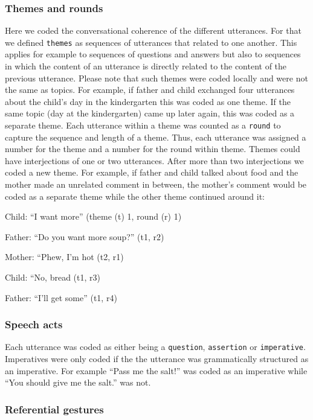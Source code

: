 \documentclass[
  man,floatsintext]{apa6}
\begin{document}
\hypertarget{themes-and-rounds}{%
\subsubsection{Themes and rounds}\label{themes-and-rounds}}

Here we coded the conversational coherence of the different utterances. For that we defined \texttt{themes} as sequences of utterances that related to one another. This applies for example to sequences of questions and answers but also to sequences in which the content of an utterance is directly related to the content of the previous utterance. Please note that such themes were coded locally and were not the same as topics. For example, if father and child exchanged four utterances about the child's day in the kindergarten this was coded as one theme. If the same topic (day at the kindergarten) came up later again, this was coded as a separate theme. Each utterance within a theme was counted as a \texttt{round} to capture the sequence and length of a theme. Thus, each utterance was assigned a number for the theme and a number for the round within theme. Themes could have interjections of one or two utterances. After more than two interjections we coded a new theme. For example, if father and child talked about food and the mother made an unrelated comment in between, the mother's comment would be coded as a separate theme while the other theme continued around it:

Child: ``I want more'' (theme (t) 1, round (r) 1)

Father: ``Do you want more soup?'' (t1, r2)

Mother: ``Phew, I'm hot (t2, r1)

Child: ``No, bread (t1, r3)

Father: ``I'll get some'' (t1, r4)

\hypertarget{speech-acts}{%
\subsubsection{Speech acts}\label{speech-acts}}

Each utterance was coded as either being a \texttt{question}, \texttt{assertion} or \texttt{imperative}. Imperatives were only coded if the the utterance was grammatically structured as an imperative. For example ``Pass me the salt!'' was coded as an imperative while ``You should give me the salt.'' was not.

\hypertarget{referential-gestures}{%
\subsubsection{Referential gestures}\label{referential-gestures}}
\end{document}
